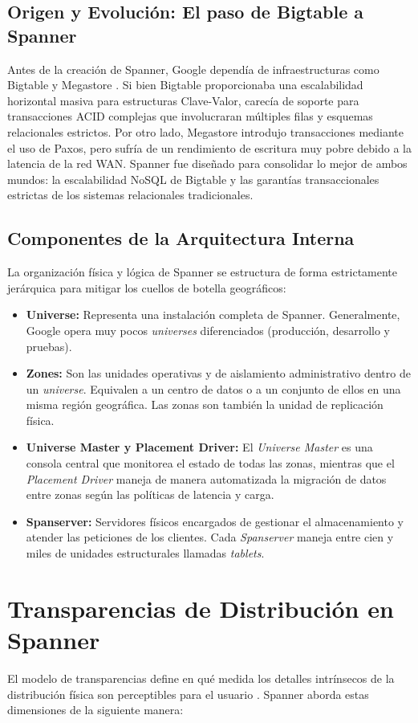 \documentclass[11pt,a4paper]{article}
\begin{document}
\subsection{Origen y Evolución: El paso de Bigtable a Spanner}
Antes de la creación de Spanner, Google dependía de infraestructuras como Bigtable y Megastore \cite{corbett2012}. Si bien Bigtable proporcionaba una escalabilidad horizontal masiva para estructuras Clave-Valor, carecía de soporte para transacciones ACID complejas que involucraran múltiples filas y esquemas relacionales estrictos. Por otro lado, Megastore introdujo transacciones mediante el uso de Paxos, pero sufría de un rendimiento de escritura muy pobre debido a la latencia de la red WAN. Spanner fue diseñado para consolidar lo mejor de ambos mundos: la escalabilidad NoSQL de Bigtable y las garantías transaccionales estrictas de los sistemas relacionales tradicionales.

\subsection{Componentes de la Arquitectura Interna}
La organización física y lógica de Spanner se estructura de forma estrictamente jerárquica para mitigar los cuellos de botella geográficos:
\begin{itemize}
    \item \textbf{Universe:} Representa una instalación completa de Spanner. Generalmente, Google opera muy pocos \textit{universes} diferenciados (producción, desarrollo y pruebas).
    \item \textbf{Zones:} Son las unidades operativas y de aislamiento administrativo dentro de un \textit{universe}. Equivalen a un centro de datos o a un conjunto de ellos en una misma región geográfica. Las zonas son también la unidad de replicación física.
    \item \textbf{Universe Master y Placement Driver:} El \textit{Universe Master} es una consola central que monitorea el estado de todas las zonas, mientras que el \textit{Placement Driver} maneja de manera automatizada la migración de datos entre zonas según las políticas de latencia y carga.
    \item \textbf{Spanserver:} Servidores físicos encargados de gestionar el almacenamiento y atender las peticiones de los clientes. Cada \textit{Spanserver} maneja entre cien y miles de unidades estructurales llamadas \textit{tablets}.
\end{itemize}

\section{Transparencias de Distribución en Spanner}
El modelo de transparencias define en qué medida los detalles intrínsecos de la distribución física son perceptibles para el usuario \cite{tanenbaum2017}. Spanner aborda estas dimensiones de la siguiente manera:
\end{document}
